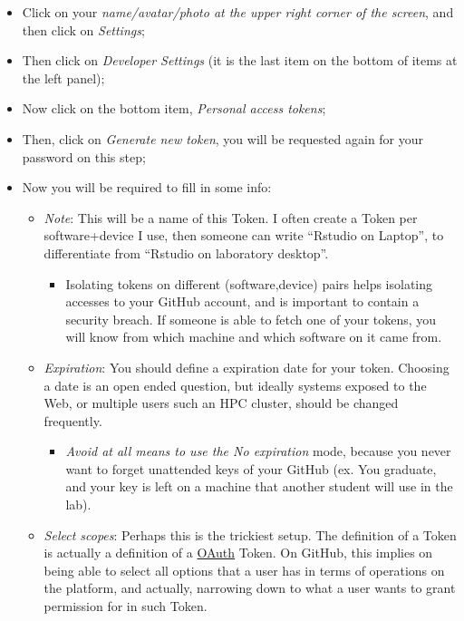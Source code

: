 \documentclass[
]{book}
\providecommand{\tightlist}{%
  \setlength{\itemsep}{0pt}\setlength{\parskip}{0pt}}
\begin{document}
\begin{itemize}
\tightlist
\item
  Click on your \emph{name/avatar/photo at the upper right corner of the screen}, and
  then click on \emph{Settings};
\item
  Then click on \emph{Developer Settings} (it is the last item on the bottom of
  items at the left panel);
\item
  Now click on the bottom item, \emph{Personal access tokens};
\item
  Then, click on \emph{Generate new token}, you will be requested again for your
  password on this step;
\item
  Now you will be required to fill in some info:

  \begin{itemize}
  \tightlist
  \item
    \emph{Note}: This will be a name of this Token. I often create a Token per
    software+device I use, then someone can write ``Rstudio on Laptop'', to
    differentiate from ``Rstudio on laboratory desktop''.

    \begin{itemize}
    \tightlist
    \item
      Isolating tokens on different (software,device) pairs helps isolating
      accesses to your GitHub account, and is important to contain a security
      breach. If someone is able to fetch one of your tokens, you will know from
      which machine and which software on it came from.
    \end{itemize}
  \item
    \emph{Expiration}: You should define a expiration date for your token. Choosing
    a date is an open ended question, but ideally systems exposed to the Web, or
    multiple users such an HPC cluster, should be changed frequently.

    \begin{itemize}
    \tightlist
    \item
      \emph{Avoid at all means to use the No expiration} mode, because you never
      want to forget unattended keys of your GitHub (ex. You graduate, and your
      key is left on a machine that another student will use in the lab).
    \end{itemize}
  \item
    \emph{Select scopes}: Perhaps this is the trickiest setup. The definition of a
    Token is actually a definition of a \href{https://en.wikipedia.org/wiki/OAuth}{OAuth}
    Token. On GitHub, this implies on being able to select all options that a user
    has in terms of operations on the platform, and actually, narrowing down to
    what a user wants to grant permission for in such Token.


\end{itemize}
\end{itemize}
\end{document}
